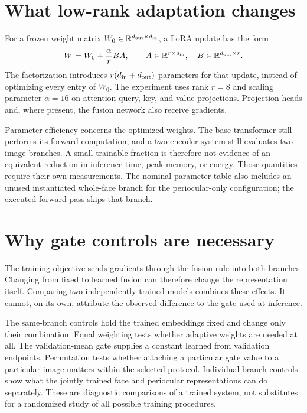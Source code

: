 \documentclass[12pt,a4paper,oneside]{report}
\begin{document}
\section{What low-rank adaptation changes}
For a frozen weight matrix $W_0\in\mathbb R^{d_{\rm out}\times d_{\rm in}}$, a LoRA update has the form
\begin{equation}
W=W_0+\frac{\alpha}{r}BA,
\qquad A\in\mathbb R^{r\times d_{\rm in}},\quad
B\in\mathbb R^{d_{\rm out}\times r}.
\end{equation}
The factorization introduces $r(d_{\rm in}+d_{\rm out})$ parameters for that update, instead of optimizing every entry of $W_0$. The experiment uses rank $r=8$ and scaling parameter $\alpha=16$ on attention query, key, and value projections. Projection heads and, where present, the fusion network also receive gradients.

Parameter efficiency concerns the optimized weights. The base transformer still performs its forward computation, and a two-encoder system still evaluates two image branches. A small trainable fraction is therefore not evidence of an equivalent reduction in inference time, peak memory, or energy. Those quantities require their own measurements. The nominal parameter table also includes an unused instantiated whole-face branch for the periocular-only configuration; the executed forward pass skips that branch.

\section{Why gate controls are necessary}
The training objective sends gradients through the fusion rule into both branches. Changing from fixed to learned fusion can therefore change the representation itself. Comparing two independently trained models combines these effects. It cannot, on its own, attribute the observed difference to the gate used at inference.

The same-branch controls hold the trained embeddings fixed and change only their combination. Equal weighting tests whether adaptive weights are needed at all. The validation-mean gate supplies a constant learned from validation endpoints. Permutation tests whether attaching a particular gate value to a particular image matters within the selected protocol. Individual-branch controls show what the jointly trained face and periocular representations can do separately. These are diagnostic comparisons of a trained system, not substitutes for a randomized study of all possible training procedures.
\end{document}
